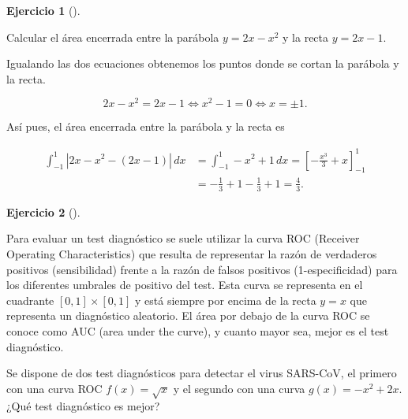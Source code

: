 \documentclass[
  spanish,
  a4paper,
]{scrreport}
\theoremstyle{definition}
\newtheorem{exercise}{Ejercicio}[chapter]
\theoremstyle{remark}
\begin{document}
\begin{exercise}[]\protect\hypertarget{exr-area-entre-funciones-2}{}\label{exr-area-entre-funciones-2}

Calcular el área encerrada entre la parábola \(y=2x-x^2\) y la recta
\(y=2x-1\).

\end{exercise}

\begin{tcolorbox}[enhanced jigsaw, arc=.35mm, bottomrule=.15mm, bottomtitle=1mm, breakable, colback=white, colbacktitle=quarto-callout-tip-color!10!white, colframe=quarto-callout-tip-color-frame, coltitle=black, left=2mm, leftrule=.75mm, opacityback=0, opacitybacktitle=0.6, rightrule=.15mm, title=\textcolor{quarto-callout-tip-color}{\faLightbulb}\hspace{0.5em}{Solución}, titlerule=0mm, toprule=.15mm, toptitle=1mm]

Igualando las dos ecuaciones obtenemos los puntos donde se cortan la
parábola y la recta.

\[
2x-x^2=2x-1 \Leftrightarrow x^2-1 = 0 \Leftrightarrow x=\pm 1.
\]

Así pues, el área encerrada entre la parábola y la recta es

\begin{align*}
\int_{-1}^1 |2x-x^2 - (2x-1)|\,dx 
&= \int_{-1}^1 -x^2+1\,dx = \left[-\frac{x^3}{3}+x\right]_{-1}^1 \\
&= -\frac{1}{3}+1-\frac{1}{3}+1 = \frac{4}{3}.
\end{align*}

\end{tcolorbox}

\begin{exercise}[]\protect\hypertarget{exr-curva-roc}{}\label{exr-curva-roc}

Para evaluar un test diagnóstico se suele utilizar la curva ROC
(Receiver Operating Characteristics) que resulta de representar la razón
de verdaderos positivos (sensibilidad) frente a la razón de falsos
positivos (1-especificidad) para los diferentes umbrales de positivo del
test. Esta curva se representa en el cuadrante \([0,1]\times [0,1]\) y
está siempre por encima de la recta \(y=x\) que representa un
diagnóstico aleatorio. El área por debajo de la curva ROC se conoce como
AUC (area under the curve), y cuanto mayor sea, mejor es el test
diagnóstico.

Se dispone de dos test diagnósticos para detectar el virus SARS-CoV, el
primero con una curva ROC \(f(x)=\sqrt{x}\) y el segundo con una curva
\(g(x)=-x^2+2x\). ¿Qué test diagnóstico es mejor?

\end{exercise}
\end{document}
